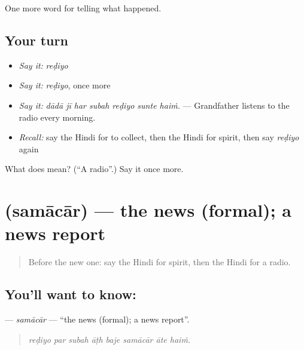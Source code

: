 \begin{grammarlens}[title={What you've built}]
One more word for telling what happened.
\end{grammarlens}

\subsection*{Your turn}
\begin{itemize}
\raggedright
  \item \emph{Say it:} \emph{reḍiyo}
  \item \emph{Say it:} \emph{reḍiyo}, once more
  \item \emph{Say it:} \emph{dādā jī har subah reḍiyo sunte haiṁ.} — Grandfather listens to the radio every morning.
  \item \emph{Recall:} say the Hindi for to collect, then the Hindi for spirit, then say \emph{reḍiyo} again
\end{itemize}

\begin{tcolorbox}[breakable,colback=teal!4,colframe=teal!35!black,title={Before you move on}]
What does  mean? (\textquotedblleft{}A radio\textquotedblright{}.) Say it once more.
\end{tcolorbox}
\section[\texorpdfstring{\hi{समाचार} (samācār)}{समाचार (samācār)}]{ (samācār) — the news (formal); a news report}

\label{lesson:HI-C312-samacar}



\begin{quote}
Before the new one: say the Hindi for spirit, then the Hindi for a radio.
\end{quote}

\subsection*{You'll want to know: }
\textbf{} — \emph{samācār} — \textquotedblleft{}the news (formal); a news report\textquotedblright{}.

\begin{quote}
       
\end{quote}

\begin{quote}
\emph{reḍiyo par subah āṭh baje samācār āte haiṁ.}
\end{quote}

